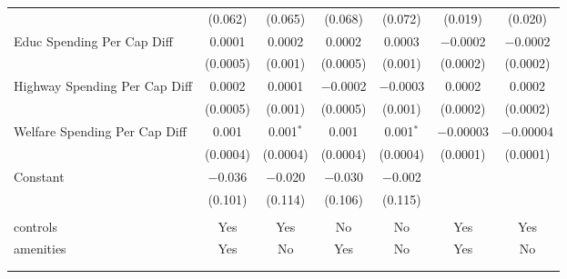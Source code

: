 \begin{table}[!htbp]
\begin{tabular}{@{\extracolsep{5pt}}lcccccc}
  & (0.062) & (0.065) & (0.068) & (0.072) & (0.019) & (0.020) \\ 
  Educ Spending Per Cap Diff & 0.0001 & 0.0002 & 0.0002 & 0.0003 & $-$0.0002 & $-$0.0002 \\ 
  & (0.0005) & (0.001) & (0.0005) & (0.001) & (0.0002) & (0.0002) \\ 
  Highway Spending Per Cap Diff & 0.0002 & 0.0001 & $-$0.0002 & $-$0.0003 & 0.0002 & 0.0002 \\ 
  & (0.0005) & (0.001) & (0.0005) & (0.001) & (0.0002) & (0.0002) \\ 
  Welfare Spending Per Cap Diff & 0.001 & 0.001$^{*}$ & 0.001 & 0.001$^{*}$ & $-$0.00003 & $-$0.00004 \\ 
  & (0.0004) & (0.0004) & (0.0004) & (0.0004) & (0.0001) & (0.0001) \\ 
  Constant & $-$0.036 & $-$0.020 & $-$0.030 & $-$0.002 &  &  \\ 
  & (0.101) & (0.114) & (0.106) & (0.115) &  &  \\ 
 \hline \\[-1.8ex] 
controls & Yes & Yes & No & No & Yes & Yes \\ 
amenities & Yes & No & Yes & No & Yes & No \\ 
\hline \\[-1.8ex] 
\hline 
\hline \\[-1.8ex] 
\end{tabular} 
\end{table} 
